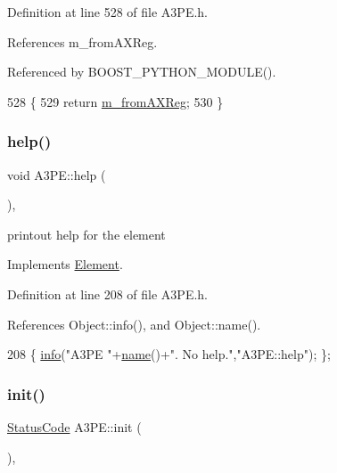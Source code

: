 Definition at line 528 of file A3\+P\+E.\+h.



References m\+\_\+from\+A\+X\+Reg.



Referenced by B\+O\+O\+S\+T\+\_\+\+P\+Y\+T\+H\+O\+N\+\_\+\+M\+O\+D\+U\+L\+E().


\begin{DoxyCode}
528                        \{
529     \textcolor{keywordflow}{return} \hyperlink{classA3PE_acbfe708ac0a81243959c96124f192b9e}{m\_fromAXReg};
530   \}
\end{DoxyCode}
\mbox{\label{classA3PE_ae495a413cc26d31321b31942ebef1bfa}} 
\subsubsection{\texorpdfstring{help()}{help()}}
{\footnotesize\ttfamily void A3\+P\+E\+::help (\begin{DoxyParamCaption}{ }\end{DoxyParamCaption})\hspace{0.3cm}{\ttfamily [inline]}, {\ttfamily [virtual]}}

printout help for the element 

Implements \hyperlink{classElement_a32c0de27acb08e17251cef88c3e9303a}{Element}.



Definition at line 208 of file A3\+P\+E.\+h.



References Object\+::info(), and Object\+::name().


\begin{DoxyCode}
208 \{ \hyperlink{classObject_a644fd329ea4cb85f54fa6846484b84a8}{info}(\textcolor{stringliteral}{"A3PE "}+\hyperlink{classObject_a300f4c05dd468c7bb8b3c968868443c1}{name}()+\textcolor{stringliteral}{". No help."},\textcolor{stringliteral}{"A3PE::help"}); \};
\end{DoxyCode}
\mbox{\label{classA3PE_abe07bae8ce2f32926b7258f269ae655e}} 
\subsubsection{\texorpdfstring{init()}{init()}}
{\footnotesize\ttfamily \hyperlink{classStatusCode}{Status\+Code} A3\+P\+E\+::init (\begin{DoxyParamCaption}{ }\end{DoxyParamCaption})\hspace{0.3cm}{\ttfamily [inline]}, {\ttfamily [virtual]}}

